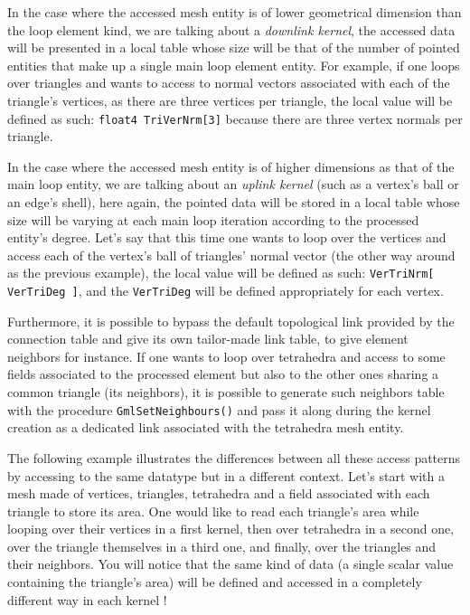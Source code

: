 \documentclass[a4paper,12pt]{article}
\begin{document}
In the case where the accessed mesh entity is of lower geometrical dimension than the loop element kind, we are talking about a \emph{downlink kernel}, the accessed data will be presented in a local table whose size will be that of the number of pointed entities that make up a single main loop element entity. For example, if one loops over triangles and wants to access to normal vectors associated with each of the triangle's vertices, as there are three vertices per triangle, the local value will be defined as such: {\tt float4 TriVerNrm[3]} because there are three vertex normals per triangle.

In the case where the accessed mesh entity is of higher dimensions as that of the main loop entity, we are talking about an \emph{uplink kernel} (such as a vertex's ball or an edge's shell), here again, the pointed data will be stored in a local table whose size will be varying at each main loop iteration according to the processed entity's degree. Let's say that this time one wants to loop over the vertices and access each of the vertex's ball of triangles' normal vector (the other way around as the previous example), the local value will be defined as such: {\tt VerTriNrm[ VerTriDeg ]}, and the {\tt VerTriDeg} will be defined appropriately for each vertex.

Furthermore, it is possible to bypass the default topological link provided by the connection table and give its own tailor-made link table, to give element neighbors for instance. If one wants to loop over tetrahedra and access to some fields associated to the processed element but also to the other ones sharing a common triangle (its neighbors), it is possible to generate such neighbors table with the procedure {\tt GmlSetNeighbours()} and pass it along during the kernel creation as a dedicated link associated with the tetrahedra mesh entity.

The following example illustrates the differences between all these access patterns by accessing to the same datatype but in a different context. Let's start with a mesh made of vertices, triangles, tetrahedra and a field associated with each triangle to store its area. One would like to read each triangle's area while looping over their vertices in a first kernel, then over tetrahedra in a second one, over the triangle themselves in a third one, and finally, over the triangles and their neighbors. You will notice that the same kind of data (a single scalar value containing the triangle's area) will be defined and accessed in a completely different way in each kernel !
\end{document}
